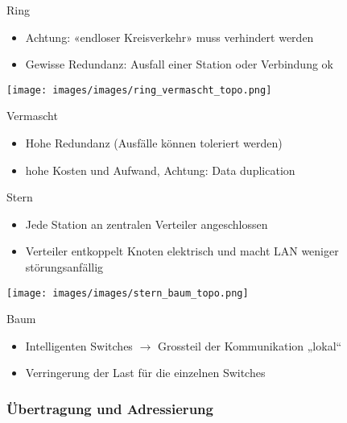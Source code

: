 \begin{definition}{Ring}
    \begin{itemize}
        \item Achtung: «endloser Kreisverkehr» muss verhindert werden
        \item Gewisse Redundanz: Ausfall einer Station oder Verbindung ok
    \end{itemize}
\end{definition}

 
    \centering
    \texttt{[image: images/images/ring\_vermascht\_topo.png]}
 

\begin{definition}{Vermascht}
    \begin{itemize}
        \item Hohe Redundanz (Ausfälle können toleriert werden)
        \item hohe Kosten und Aufwand, Achtung: Data duplication
    \end{itemize}
\end{definition}

\begin{definition}{Stern}
\begin{itemize}
    \item Jede Station an zentralen Verteiler angeschlossen
    \item Verteiler entkoppelt Knoten elektrisch und macht LAN weniger störungsanfällig
\end{itemize}
\end{definition}

 
    \centering
    \texttt{[image: images/images/stern\_baum\_topo.png]}
 

\begin{definition}{Baum}
    \begin{itemize}
        \item Intelligenten Switches $\rightarrow$ Grossteil der Kommunikation „lokal“
        \item Verringerung der Last für die einzelnen Switches
    \end{itemize}
\end{definition}

\subsubsection{Übertragung und Adressierung}

